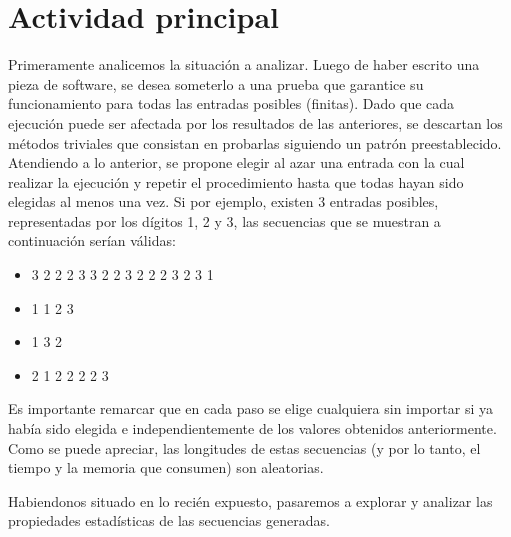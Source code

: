 \documentclass{article}
\begin{document}





\section{Actividad principal}

	Primeramente analicemos la situación a analizar. Luego de haber escrito una pieza de software, se desea someterlo a una prueba que garantice su funcionamiento para todas las entradas posibles (finitas). Dado que cada ejecución puede ser afectada por los resultados de las anteriores, se descartan los métodos triviales que consistan en probarlas siguiendo un patrón preestablecido.
	Atendiendo a lo anterior, se propone elegir al azar una entrada con la cual realizar la ejecución y repetir el procedimiento hasta que todas hayan sido elegidas al menos una vez. Si por ejemplo, existen 3 entradas posibles, representadas por los dígitos 1, 2 y 3, las secuencias que se muestran a continuación serían válidas:

\begin{itemize}
\itemsep=2pt \topsep=0pt \partopsep=0pt \parskip=0pt \parsep=0pt
	\item 3 2 2 2 3 3 2 2 3 2 2 2 3 2 3 1
	\item 1 1 2 3
	\item 1 3 2
	\item 2 1 2 2 2 2 3
\end{itemize}

	Es importante remarcar que en cada paso se elige cualquiera sin importar si ya había sido elegida e independientemente de los valores obtenidos anteriormente. Como se puede apreciar, las longitudes de estas secuencias (y por lo tanto, el tiempo y la memoria que consumen) son aleatorias.
	\par 
	Habiendonos situado en lo recién expuesto, pasaremos a explorar y analizar las propiedades estadísticas de las secuencias generadas.
\end{document}
